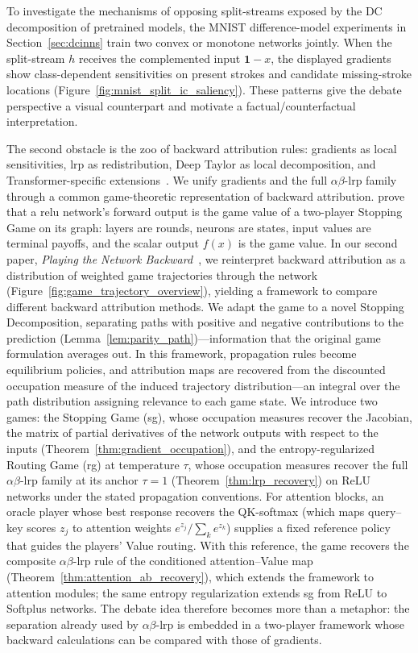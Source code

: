 To investigate the mechanisms of opposing split-streams exposed by the DC decomposition of pretrained models, the MNIST difference-model experiments in Section~\ref{sec:dcinns} train two convex or monotone networks jointly. When the split-stream $h$ receives the complemented input $\mathbf{1}-x$, the displayed gradients show class-dependent sensitivities on present strokes and candidate missing-stroke locations (Figure~\ref{fig:mnist_split_ic_saliency}). These patterns give the debate perspective a visual counterpart and motivate a factual/counterfactual interpretation.

The second obstacle is the zoo of backward attribution rules: gradients as local sensitivities, \ac{lrp} as redistribution, Deep Taylor as local decomposition, and Transformer-specific extensions~\parencite{playingBackward2026}. We unify gradients and the full $\alpha\beta$-\ac{lrp} family through a common game-theoretic representation of backward attribution.
\textcite{Gaubert2025} prove that a \ac{relu} network's forward output is the game value of a two-player Stopping Game on its graph: layers are rounds, neurons are states, input values are terminal payoffs, and the scalar output $f(x)$ is the game value. In our second paper, \emph{Playing the Network Backward}~\parencite{playingBackward2026}, we reinterpret backward attribution as a distribution of weighted game trajectories through the network (Figure~\ref{fig:game_trajectory_overview}), yielding a framework to compare different backward attribution methods. We adapt the game to a novel Stopping Decomposition, separating paths with positive and negative contributions to the prediction (Lemma~\ref{lem:parity_path})---information that the original game formulation averages out. In this framework, propagation rules become equilibrium policies, and attribution maps are recovered from the discounted occupation measure of the induced trajectory distribution---an integral over the path distribution assigning relevance to each game state. We introduce two games: the Stopping Game (\acs{sg}), whose occupation measures recover the Jacobian, the matrix of partial derivatives of the network outputs with respect to the inputs (Theorem~\ref{thm:gradient_occupation}), and the entropy-regularized Routing Game (\acs{rg}) at temperature $\tau$, whose occupation measures recover the full $\alpha\beta$-\ac{lrp} family at its anchor $\tau=1$ (Theorem~\ref{thm:lrp_recovery}) on ReLU networks under the stated propagation conventions. For attention blocks, an oracle player whose best response recovers the QK-softmax (which maps query--key scores $z_j$ to attention weights $e^{z_j}/\sum_ke^{z_k}$) supplies a fixed reference policy that guides the players' Value routing. With this reference, the game recovers the composite $\alpha\beta$-\ac{lrp} rule of the conditioned attention--Value map (Theorem~\ref{thm:attention_ab_recovery}), which extends the framework to attention modules; the same entropy regularization extends \ac{sg} from ReLU to Softplus networks. The debate idea therefore becomes more than a metaphor: the separation already used by $\alpha\beta$-\ac{lrp} is embedded in a two-player framework whose backward calculations can be compared with those of gradients.

